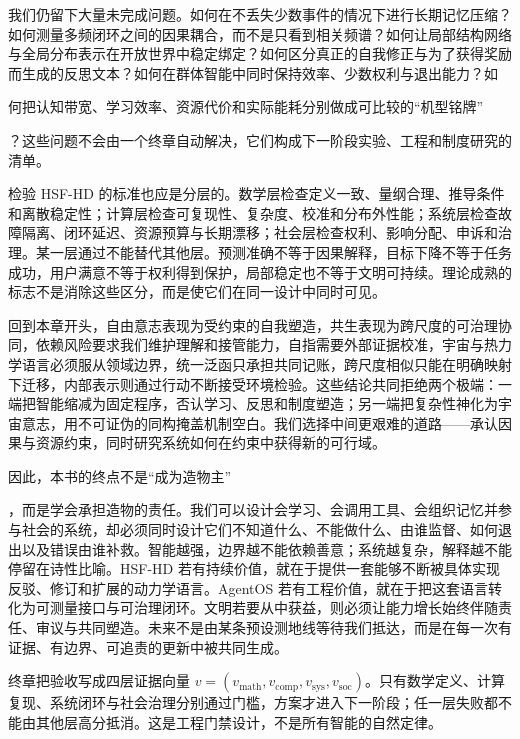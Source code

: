 我们仍留下大量未完成问题。如何在不丢失少数事件的情况下进行长期记忆压缩？如何测量多频闭环之间的因果耦合，而不是只看到相关频谱？如何让局部结构网络与全局分布表示在开放世界中稳定绑定？如何区分真正的自我修正与为了获得奖励而生成的反思文本？如何在群体智能中同时保持效率、少数权利与退出能力？如

何把认知带宽、学习效率、资源代价和实际能耗分别做成可比较的“机型铭牌”

？这些问题不会由一个终章自动解决，它们构成下一阶段实验、工程和制度研究的清单。

检验 HSF-HD 的标准也应是分层的。数学层检查定义一致、量纲合理、推导条件和离散稳定性；计算层检查可复现性、复杂度、校准和分布外性能；系统层检查故障隔离、闭环延迟、资源预算与长期漂移；社会层检查权利、影响分配、申诉和治理。某一层通过不能替代其他层。预测准确不等于因果解释，目标下降不等于任务成功，用户满意不等于权利得到保护，局部稳定也不等于文明可持续。理论成熟的标志不是消除这些区分，而是使它们在同一设计中同时可见。

回到本章开头，自由意志表现为受约束的自我塑造，共生表现为跨尺度的可治理协同，依赖风险要求我们维护理解和接管能力，自指需要外部证据校准，宇宙与热力学语言必须服从领域边界，统一泛函只承担共同记账，跨尺度相似只能在明确映射下迁移，内部表示则通过行动不断接受环境检验。这些结论共同拒绝两个极端：一端把智能缩减为固定程序，否认学习、反思和制度塑造；另一端把复杂性神化为宇宙意志，用不可证伪的同构掩盖机制空白。我们选择中间更艰难的道路——承认因果与资源约束，同时研究系统如何在约束中获得新的可行域。

因此，本书的终点不是“成为造物主”

，而是学会承担造物的责任。我们可以设计会学习、会调用工具、会组织记忆并参与社会的系统，却必须同时设计它们不知道什么、不能做什么、由谁监督、如何退出以及错误由谁补救。智能越强，边界越不能依赖善意；系统越复杂，解释越不能停留在诗性比喻。HSF-HD 若有持续价值，就在于提供一套能够不断被具体实现反驳、修订和扩展的动力学语言。AgentOS 若有工程价值，就在于把这套语言转化为可测量接口与可治理闭环。文明若要从中获益，则必须让能力增长始终伴随责任、审议与共同塑造。未来不是由某条预设测地线等待我们抵达，而是在每一次有证据、有边界、可追责的更新中被共同生成。

终章把验收写成四层证据向量 $v=(v_{\mathrm{math}},v_{\mathrm{comp}},v_{\mathrm{sys}},v_{\mathrm{soc}})$。只有数学定义、计算复现、系统闭环与社会治理分别通过门槛，方案才进入下一阶段；任一层失败都不能由其他层高分抵消。这是工程门禁设计，不是所有智能的自然定律。
